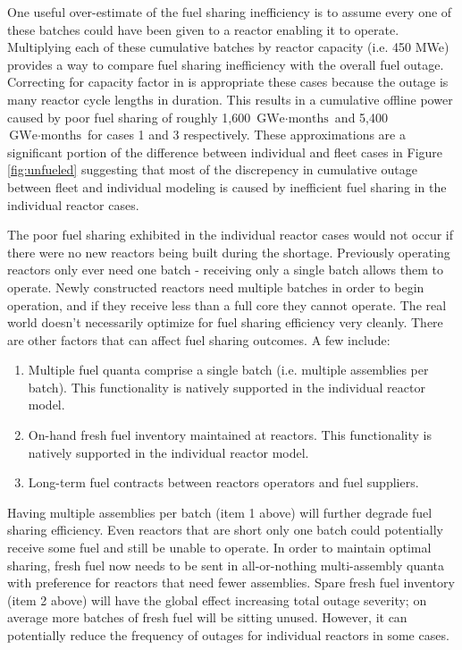 \documentclass{style}
\begin{document}
One useful over-estimate of the fuel sharing inefficiency is to assume every
one of these batches could have been given to a reactor enabling it to
operate.  Multiplying each of these cumulative batches by reactor capacity
(i.e. 450 MWe) provides a way to compare fuel sharing inefficiency with the
overall fuel outage.  Correcting for capacity factor in is appropriate these
cases because the outage is many reactor cycle lengths in duration. This
results in a cumulative offline power caused by poor fuel sharing of roughly
1,600 $\text{GWe} \cdot \text{months}$ and 5,400 $\text{GWe} \cdot
\text{months}$ for cases 1 and 3 respectively.  These approximations are a
significant portion of the difference between individual and fleet cases in
Figure \ref{fig:unfueled} suggesting that most of the discrepency
in cumulative outage between fleet and individual modeling is caused by
inefficient fuel sharing in the individual reactor cases.

The poor fuel sharing exhibited in the individual reactor cases would not
occur if there were no new reactors being built during the shortage.
Previously operating reactors only ever need one batch - receiving only a
single batch allows them to operate.  Newly constructed reactors need multiple
batches in order to begin operation, and if they receive less than a full core
they cannot operate.  The real world doesn't necessarily optimize for fuel
sharing efficiency very cleanly. There are other factors that can affect fuel
sharing outcomes.  A few include:

\begin{enumerate}

    \item Multiple fuel quanta comprise a single batch (i.e. multiple
        assemblies per batch). This functionality is natively supported in the
        individual reactor model.

    \item On-hand fresh fuel inventory maintained at reactors. This
        functionality is natively supported in the individual reactor model.

    \item Long-term fuel contracts between reactors operators and fuel
        suppliers.

\end{enumerate}

Having multiple assemblies per batch (item 1 above) will further degrade fuel
sharing efficiency.  Even reactors that are short only one batch could
potentially receive some fuel and still be unable to operate.  In order to
maintain optimal sharing, fresh fuel now needs to be sent in all-or-nothing
multi-assembly quanta with preference for reactors that need fewer assemblies.
Spare fresh fuel inventory (item 2 above) will have the global effect
increasing total outage severity; on average more batches of fresh fuel will
be sitting unused.  However, it can potentially reduce the frequency of
outages for individual reactors in some cases.
\end{document}
